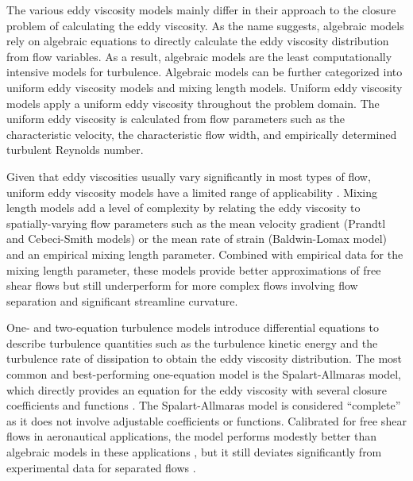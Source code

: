The various eddy viscosity models mainly differ in their approach to
the closure problem of calculating the eddy viscosity. As the name suggests,
algebraic models rely on algebraic equations to directly calculate the eddy viscosity
distribution from flow variables. As a result, algebraic models are
the least computationally intensive models for turbulence. Algebraic models
can be further categorized into uniform eddy viscosity models
and mixing length models. Uniform eddy viscosity models apply a uniform eddy
viscosity throughout the problem domain. The uniform eddy viscosity is
calculated from flow parameters such as the characteristic velocity, the
characteristic flow width, and empirically determined turbulent Reynolds
number.

Given that eddy viscosities usually vary significantly in most types of
flow, uniform eddy viscosity models have a limited range of applicability
\cite{pope_turbulent_2000}. Mixing length models add a level of complexity by
relating the eddy viscosity to spatially-varying flow parameters such as the
mean velocity gradient (Prandtl \cite{prandtl_7_1925} and Cebeci-Smith
\cite{smith_numerical_1967} models) or the mean rate of strain (Baldwin-Lomax
\cite{baldwin_thin-layer_1978} model) and an empirical mixing length parameter.
Combined with empirical data for the mixing length parameter, these
models provide better approximations of free shear flows but still
underperform for more complex flows involving flow separation and significant streamline curvature.

One- and two-equation turbulence models introduce differential equations to
describe turbulence quantities such as the turbulence kinetic energy and the
turbulence rate of dissipation to obtain the eddy viscosity distribution. The
most common and best-performing one-equation model is the Spalart-Allmaras
model, which directly provides an equation for the eddy viscosity with several
closure coefficients and functions \cite{wilcox_turbulence_2006}. The
Spalart-Allmaras model is considered ``complete'' as it does not involve
adjustable coefficients or functions. Calibrated for free shear flows in
aeronautical applications, the model performs modestly better than algebraic
models in these applications \cite{pope_turbulent_2000}, but it still deviates
significantly from experimental data
for separated flows \cite{wilcox_turbulence_2006}.

